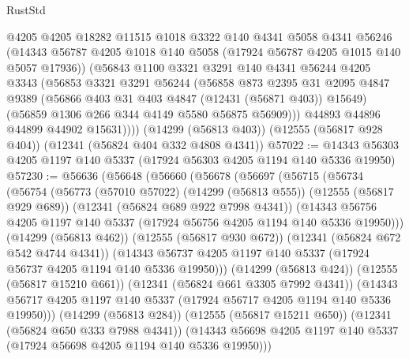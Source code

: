\begin{lexlean}{RustStd}
\begin{coremodule}
          @4205
          @4205
          @18282
          @11515
          @1018
          @3322
          @140
          @4341
          @5058
          @4341
          @56246
          (@14343 @56787 @4205 @1018 @140 @5058 (@17924 @56787 @4205 @1015 @140 @5057 @17936))
          (@56843
            @1100
            @3321
            @3291
            @140
            @4341
            @56244
            @4205
            @3343
            (@56853
              @3321
              @3291
              @56244
              (@56858
                @873
                @2395
                @31
                @2095
                @4847
                @9389
                (@56866 @403 @31 @403 @4847 (@12431 (@56871 @403)) @15649)
                (@56859 @1306 @266 @344 @4149 @5580 @56875 @56909)))
            @44893
            @44896
            @44899
            @44902
            @15631))))
    (@14299 (@56813 @403))
    (@12555 (@56817 @928 @404))
    (@12341 (@56824 @404 @332 @4808 @4341))
@57022 := @14343 @56303 @4205 @1197 @140 @5337 (@17924 @56303 @4205 @1194 @140 @5336 @19950)
@57230 := @56636
    (@56648
      (@56660
        (@56678
          (@56697
            (@56715
              (@56734
                (@56754
                  (@56773
                    (@57010 @57022)
                    (@14299 (@56813 @555))
                    (@12555 (@56817 @929 @689))
                    (@12341 (@56824 @689 @922 @7998 @4341))
                    (@14343
                      @56756
                      @4205
                      @1197
                      @140
                      @5337
                      (@17924 @56756 @4205 @1194 @140 @5336 @19950)))
                  (@14299 (@56813 @462))
                  (@12555 (@56817 @930 @672))
                  (@12341 (@56824 @672 @542 @4744 @4341))
                  (@14343
                    @56737
                    @4205
                    @1197
                    @140
                    @5337
                    (@17924 @56737 @4205 @1194 @140 @5336 @19950)))
                (@14299 (@56813 @424))
                (@12555 (@56817 @15210 @661))
                (@12341 (@56824 @661 @3305 @7992 @4341))
                (@14343
                  @56717
                  @4205
                  @1197
                  @140
                  @5337
                  (@17924 @56717 @4205 @1194 @140 @5336 @19950)))
              (@14299 (@56813 @284))
              (@12555 (@56817 @15211 @650))
              (@12341 (@56824 @650 @333 @7988 @4341))
              (@14343 @56698 @4205 @1197 @140 @5337 (@17924 @56698 @4205 @1194 @140 @5336 @19950)))

\end{coremodule}
\end{lexlean}
